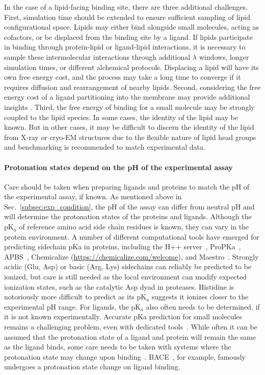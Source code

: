 \documentclass[9pt,bestpractices]{livecoms}
\begin{document}
In the case of a lipid-facing binding site, there are three additional challenges. First, simulation time should be extended to ensure sufficient sampling of lipid configurational space. Lipids may either bind alongside small molecules, acting as cofactors, or be displaced from the binding site by a ligand. If lipids participate in binding through protein-lipid or ligand-lipid interactions, it is necessary to sample these intermolecular interactions through additional $\lambda$ windows, longer simulation times, or different alchemical protocols. Displacing a lipid will have its own free energy cost, and the process may take a long time to converge if it requires diffusion and rearrangement of nearby lipids. Second, considering the free energy cost of a ligand partitioning into the membrane may provide additional insights \cite{doi:10.1021/acs.jcim.1c01147}. Third, the free energy of binding for a small molecule may be strongly coupled to the lipid species. In some cases, the identity of the lipid may be known. But in other cases, it may be difficult to discern the identity of the lipid from X-ray or cryo-EM structures due to the flexible nature of lipid head groups and benchmarking is recommended to match experimental data.

\paragraph{Protonation states depend on the pH of the experimental assay}
Care should be taken when preparing ligands and proteins to match the pH of the experimental assay, if known. As mentioned above in Sec.~\ref{subsec:exp_condition}, the pH of the assay can differ from neutral pH and will determine the protonation states of the proteins and ligands. Although the pK$_a$ of reference amino acid side chain residues is known, they can vary in the protein environment. A number of different computational tools have emerged for predicting sidechain pKa in proteins, including the H++ server~\cite{anandakrishnan2012automating}, ProPKa~\cite{olsson2011propka3,sondergaard2011improved}, APBS~\cite{jurrus2018improvement}, Chemicalize (\url{https://chemicalize.com/welcome}), and Maestro~\cite{2020schrodinger}. Strongly acidic (Glu, Asp) or basic (Arg, Lys) sidechains can reliably be predicted to be ionized, but care is still needed as the local environment can modify expected ionization states, such as  the catalytic Asp dyad in proteases. Histidine is notoriously more difficult to predict as its pK$_a$ suggests it ionizes closer to the experimental pH range. For ligands, the pK$_a$ also often needs to be determined, if it is not known experimentally. Accurate pKa prediction for small molecules remains a challenging problem, even with dedicated tools~\cite{isik2018pka}. While often it can be assumed that the protonation state of a ligand and protein will remain the same as the ligand binds, some care needs to be taken with systems where the protonation state may change upon binding~\cite{onufriev2013protonation}. BACE~\cite{kim2015conformational}, for example, famously undergoes a protonation state change on ligand binding.
\end{document}
